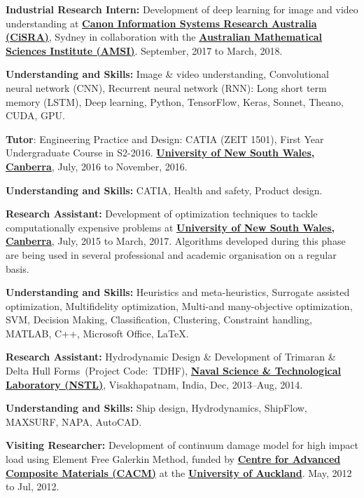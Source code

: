 \documentclass[10pt]{article}
\renewcommand{\section}[1]{\pagebreak[3]%
    \vspace{1.3\baselineskip}%
    \phantomsection\addcontentsline{toc}{section}{#1}%
    \noindent\llap{\scshape\smash{\parbox[t]{\marginparwidth}{\hyphenpenalty=10000\raggedright #1}}}%
    \vspace{-\baselineskip}\par}
\begin{document}
\section{Experience}
\begin{innerlist}
	\item \textbf{Industrial Research Intern:} Development of deep learning for image and video understanding at \href{https://www.cisra.com.au//}{\textbf{Canon Information Systems Research Australia (CiSRA)}}, Sydney in collaboration with the \href{https://http://amsi.org.au//}{\textbf{Australian Mathematical Sciences Institute (AMSI)}}. September, 2017 to March, 2018. 
	
	\textbf{Understanding and Skills:} Image \& video understanding, Convolutional neural network (CNN), Recurrent neural network (RNN): Long short term memory (LSTM), Deep learning, Python, TensorFlow, Keras, Sonnet, Theano, CUDA, GPU. 
	\item \textbf{Tutor}: Engineering Practice and Design: CATIA (ZEIT 1501), First Year Undergraduate Course in S2-2016. \href{https://www.unsw.adfa.edu.au/}{\textbf{University of New South Wales, Canberra}}, July, 2016 to November, 2016.
	 
	 \textbf{Understanding and Skills:} CATIA, Health and safety, Product design.
	\item \textbf{Research Assistant:} Development of optimization techniques to tackle computationally expensive problems at \href{https://www.unsw.adfa.edu.au/}{\textbf{University of New South Wales, Canberra}}, July, 2015 to March, 2017. Algorithms developed during this phase are being used in several professional and academic organisation on a regular basis.
	
	\textbf{Understanding and Skills:} Heuristics and meta-heuristics, Surrogate assisted optimization, Multifidelity optimization, Multi-and many-objective optimization, SVM, Decision Making, Classification, Clustering, Constraint handling, MATLAB, C++, Microsoft Office, LaTeX.
	\item \textbf{Research Assistant:} Hydrodynamic Design \& Development of Trimaran \& Delta Hull Forms~(Project Code:~TDHF), \href{https://www.drdo.gov.in/drdo/labs1/NSTL/English/indexnew.jsp?pg=homepage.jsp}{\textbf{Naval Science \& Technological Laboratory (NSTL)}}, Visakhapatnam, India, Dec, 2013--Aug, 2014.
	
	\textbf{Understanding and Skills:} Ship design, Hydrodynamics, ShipFlow, MAXSURF, NAPA, AutoCAD.
	\item \textbf{Visiting Researcher:} Development of continuum damage model for high impact load using Element Free Galerkin Method, funded by \href{http://www.cacm.auckland.ac.nz/en/cacm.html}{\textbf{Centre for Advanced Composite Materials (CACM)}} at the \href{https://www.auckland.ac.nz/en.html}{\textbf{University of Auckland}}. May, 2012 to Jul, 2012.
	

\end{innerlist}
\end{document}
